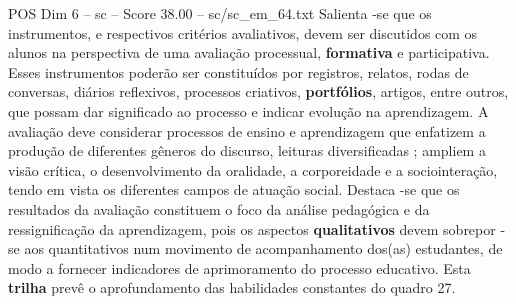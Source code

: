 \begin{textsample}{POS Dim 6 – sc – Score 38.00 – sc/sc\_em\_64.txt}
Salienta -se que os instrumentos, e respectivos critérios avaliativos, devem ser discutidos com os alunos na perspectiva de uma avaliação processual, \textbf{formativa} e participativa.
Esses instrumentos poderão ser constituídos por registros, relatos, rodas de conversas, diários reflexivos, processos criativos, \textbf{portfólios}, artigos, entre outros, que possam dar significado ao processo e indicar evolução na aprendizagem.
A avaliação deve considerar processos de ensino e aprendizagem que enfatizem a produção de diferentes gêneros do discurso, leituras diversificadas ; ampliem a visão crítica, o desenvolvimento da oralidade, a corporeidade e a sociointeração, tendo em vista os diferentes campos de atuação social.
Destaca -se que os resultados da avaliação constituem o foco da análise pedagógica e da ressignificação da aprendizagem, pois os aspectos \textbf{qualitativos} devem sobrepor -se aos quantitativos num movimento de acompanhamento dos(as) estudantes, de modo a fornecer indicadores de aprimoramento do processo educativo.
Esta \textbf{trilha} prevê o aprofundamento das habilidades constantes do quadro 27.

\end{textsample}
